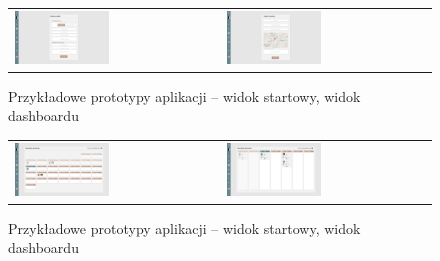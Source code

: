 \begin{figure}[H]
    \centering
      \begin{tabular}{@{}ll@{}}
        \includegraphics[width=0.475\textwidth]{rysunki/Home - dog creator.png} & 
        \includegraphics[width=0.475\textwidth]{rysunki/Home - walk creator.png}
      \end{tabular}
    \caption{Przykładowe prototypy aplikacji -- widok startowy, widok dashboardu}
    \label{fig:mocks-creators}
\end{figure}

\begin{figure}[H]
    \centering
      \begin{tabular}{@{}ll@{}}
        \includegraphics[width=0.475\textwidth]{rysunki/Home - walk calendar month.png} & 
        \includegraphics[width=0.475\textwidth]{rysunki/Home - walk calendar week.png}
      \end{tabular}
    \caption{Przykładowe prototypy aplikacji -- widok startowy, widok dashboardu}
    \label{fig:mocks-calendars}
\end{figure}

